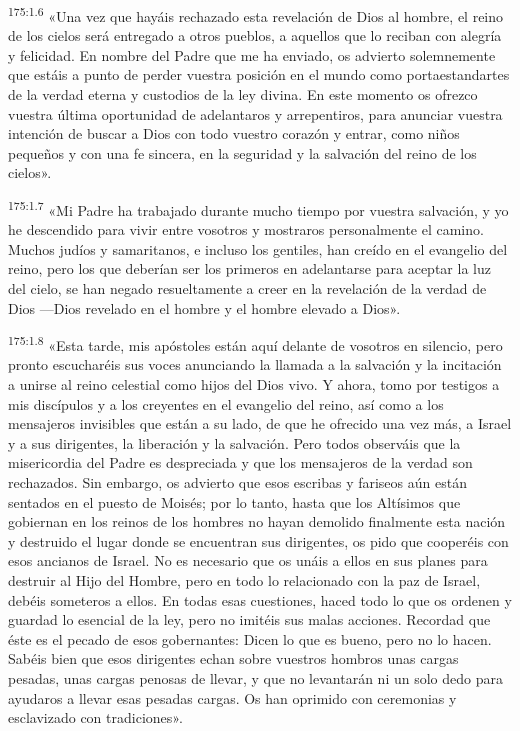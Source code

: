 \par 
\textsuperscript{175:1.6} «Una vez que hayáis rechazado esta revelación de Dios al hombre, el reino de los cielos será entregado a otros pueblos, a aquellos que lo reciban con alegría y felicidad. En nombre del Padre que me ha enviado, os advierto solemnemente que estáis a punto de perder vuestra posición en el mundo como portaestandartes de la verdad eterna y custodios de la ley divina. En este momento os ofrezco vuestra última oportunidad de adelantaros y arrepentiros, para anunciar vuestra intención de buscar a Dios con todo vuestro corazón y entrar, como niños pequeños y con una fe sincera, en la seguridad y la salvación del reino de los cielos».

\par 
\textsuperscript{175:1.7} «Mi Padre ha trabajado durante mucho tiempo por vuestra salvación, y yo he descendido para vivir entre vosotros y mostraros personalmente el camino. Muchos judíos y samaritanos, e incluso los gentiles, han creído en el evangelio del reino, pero los que deberían ser los primeros en adelantarse para aceptar la luz del cielo, se han negado resueltamente a creer en la revelación de la verdad de Dios ---Dios revelado en el hombre y el hombre elevado a Dios».

\par 
\textsuperscript{175:1.8} «Esta tarde, mis apóstoles están aquí delante de vosotros en silencio, pero pronto escucharéis sus voces anunciando la llamada a la salvación y la incitación a unirse al reino celestial como hijos del Dios vivo. Y ahora, tomo por testigos a mis discípulos y a los creyentes en el evangelio del reino, así como a los mensajeros invisibles que están a su lado, de que he ofrecido una vez más, a Israel y a sus dirigentes, la liberación y la salvación. Pero todos observáis que la misericordia del Padre es despreciada y que los mensajeros de la verdad son rechazados. Sin embargo, os advierto que esos escribas y fariseos aún están sentados en el puesto de Moisés; por lo tanto, hasta que los Altísimos que gobiernan en los reinos de los hombres no hayan demolido finalmente esta nación y destruido el lugar donde se encuentran sus dirigentes, os pido que cooperéis con esos ancianos de Israel. No es necesario que os unáis a ellos en sus planes para destruir al Hijo del Hombre, pero en todo lo relacionado con la paz de Israel, debéis someteros a ellos. En todas esas cuestiones, haced todo lo que os ordenen y guardad lo esencial de la ley, pero no imitéis sus malas acciones. Recordad que éste es el pecado de esos gobernantes: Dicen lo que es bueno, pero no lo hacen. Sabéis bien que esos dirigentes echan sobre vuestros hombros unas cargas pesadas, unas cargas penosas de llevar, y que no levantarán ni un solo dedo para ayudaros a llevar esas pesadas cargas. Os han oprimido con ceremonias y esclavizado con tradiciones».

